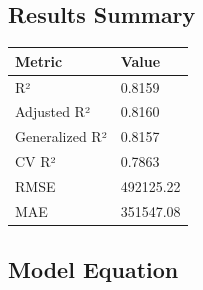 \documentclass[
]{article}
\begin{document}
\subsection{Results Summary}\label{results-summary}

{\def\LTcaptype{} %
\begin{longtable}[]{@{}ll@{}}
\toprule\noalign{}
Metric & Value \\
\midrule\noalign{}
\endhead
\bottomrule\noalign{}
\endlastfoot
R² & 0.8159 \\
Adjusted R² & 0.8160 \\
Generalized R² & 0.8157 \\
CV R² & 0.7863 \\
RMSE & 492125.22 \\
MAE & 351547.08 \\
\end{longtable}
}

\subsection{Model Equation}\label{model-equation}
\end{document}
